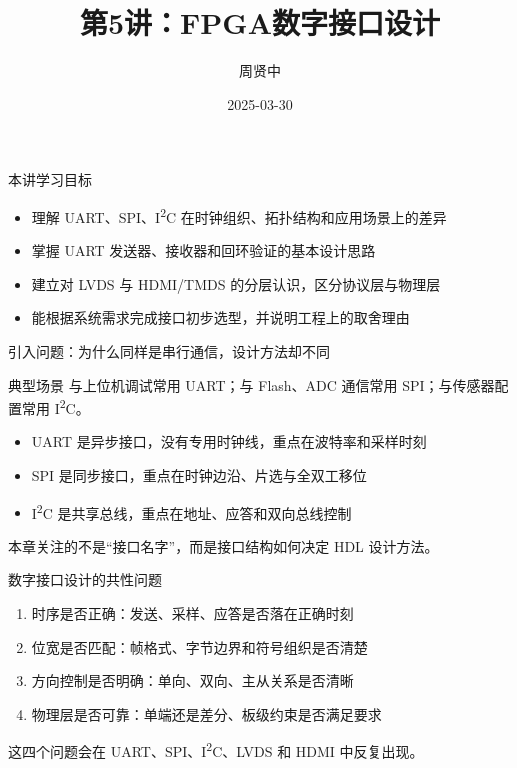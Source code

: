 \documentclass[aspectratio=169,11pt]{beamer}
\title{第5讲：FPGA数字接口设计}
\author{周贤中}
\date{2025-03-30}
\begin{document}
\begin{frame}
  \titlepage
\end{frame}

\begin{frame}{本讲学习目标}
  \begin{itemize}
    \item 理解 UART、SPI、I\textsuperscript{2}C 在时钟组织、拓扑结构和应用场景上的差异
    \item 掌握 UART 发送器、接收器和回环验证的基本设计思路
    \item 建立对 LVDS 与 HDMI/TMDS 的分层认识，区分协议层与物理层
    \item 能根据系统需求完成接口初步选型，并说明工程上的取舍理由
  \end{itemize}
\end{frame}

\begin{frame}{引入问题：为什么同样是串行通信，设计方法却不同}
  \begin{block}{典型场景}
    与上位机调试常用 UART；与 Flash、ADC 通信常用 SPI；与传感器配置常用 I\textsuperscript{2}C。
  \end{block}
  \vspace{0.5em}
  \begin{itemize}
    \item UART 是异步接口，没有专用时钟线，重点在波特率和采样时刻
    \item SPI 是同步接口，重点在时钟边沿、片选与全双工移位
    \item I\textsuperscript{2}C 是共享总线，重点在地址、应答和双向总线控制
  \end{itemize}
  \vspace{0.5em}
  本章关注的不是“接口名字”，而是接口结构如何决定 HDL 设计方法。
\end{frame}

\begin{frame}{数字接口设计的共性问题}
  \begin{enumerate}
    \item 时序是否正确：发送、采样、应答是否落在正确时刻
    \item 位宽是否匹配：帧格式、字节边界和符号组织是否清楚
    \item 方向控制是否明确：单向、双向、主从关系是否清晰
    \item 物理层是否可靠：单端还是差分、板级约束是否满足要求
  \end{enumerate}
  \vspace{0.5em}
  这四个问题会在 UART、SPI、I\textsuperscript{2}C、LVDS 和 HDMI 中反复出现。
\end{frame}
\end{document}
